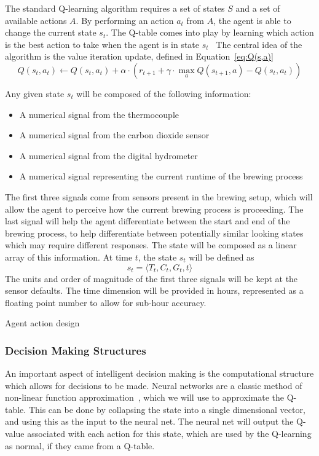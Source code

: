 \documentclass[draftclsnofoot,onecolumn,letterpaper,10pt]{IEEEtran}
\begin{document}
The standard Q-learning algorithm requires a set of states $S$ and a set of available actions $A$.
By performing an action $a_t$ from $A$, the agent is able to change the current state $s_t$.
The Q-table comes into play by learning which action is the best action to take when the agent is in state $s_t$~\cite{SuttonBarto}
The central idea of the algorithm is the value iteration update, defined in Equation~\ref{eq:Q(s,a)}
\begin{equation}\label{eq:Q(s,a)}
	Q(s_t,a_t) \leftarrow Q(s_t, a_t) + \alpha \cdot \left( r_{t+1} + \gamma \cdot \max_a Q(s_{t+1},a) - Q(s_t,a_t) \right)
\end{equation}

Any given state $s_t$ will be composed of the following information:
\begin{itemize}
	\item A numerical signal from the thermocouple
	\item A numerical signal from the carbon dioxide sensor
	\item A numerical signal from the digital hydrometer
	\item A numerical signal representing the current runtime of the brewing process
\end{itemize}
The first three signals come from sensors present in the brewing setup, which will allow the agent to perceive how the current brewing process is proceeding.
The last signal will help the agent differentiate between the start and end of the brewing process, to help differentiate between potentially similar looking states which may require different responses.
The state will be composed as a linear array of this information.
At time $t$, the state $s_t$ will be defined as
\begin{equation}
	s_t = \langle T_t, C_t, G_t, t \rangle
\end{equation}
The units and order of magnitude of the first three signals will be kept at the sensor defaults.
The time dimension will be provided in hours, represented as a floating point number to allow for sub-hour accuracy.

Agent action design

\subsubsection{Decision Making Structures}
An important aspect of intelligent decision making is the computational structure which allows for decisions to be made.
Neural networks are a classic method of non-linear function approximation~\cite{RussellNorvig},  which we will use to approximate the Q-table.
This can be done by collapsing the state into a single dimensional vector, and using this as the input to the neural net.
The neural net will output the Q-value associated with each action for this state, which are used by the Q-learning as normal, if they came from a Q-table.
\end{document}

